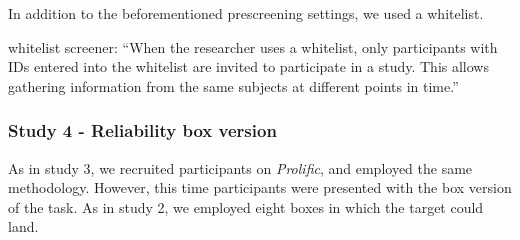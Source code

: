 \documentclass[
  english,
  man,floatsintext]{apa6}
\begin{document}
In addition to the beforementioned prescreening settings, we used a whitelist.

whitelist screener:
``When the researcher uses a whitelist,
only participants with IDs entered into the whitelist are invited to participate in a study.
This allows gathering information from the same subjects at different points in time.''

\hypertarget{study-4---reliability-box-version}{%
\subsubsection{Study 4 - Reliability box version}\label{study-4---reliability-box-version}}

As in study 3, we recruited participants on \emph{Prolific}, and employed the same methodology.
However, this time participants were presented with the box version of the task.
As in study 2, we employed eight boxes in which the target could land.
\end{document}
